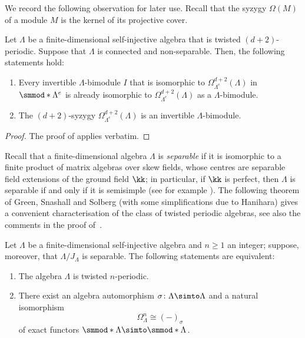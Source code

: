 \documentclass[a4paper]{amsart}
\begin{document}
We record the following observation for later use. Recall that the syzygy
$\Omega(M)$ of a module $M$ is the kernel of its projective cover.

\begin{proposition}
  \label{prop:unique_suspension} Let $\Lambda$ be a finite-dimensional
  self-injective algebra that is twisted $(d+2)$-periodic. Suppose that
  $\Lambda$ is connected and non-separable. Then, the following statements hold:
  \begin{enumerate}
  \item Every invertible $\Lambda$-bimodule $I$ that is isomorphic to
    $\Omega_{\Lambda^e}^{d+2}(\Lambda)$ in $\smmod*{\Lambda^e}$ is already
    isomorphic to $\Omega_{\Lambda^e}^{d+2}(\Lambda)$ as a $\Lambda$-bimodule.
  \item The $(d+2)$-syzygy $\Omega_{\Lambda^e}^{d+2}(\Lambda)$ is an invertible
    $\Lambda$-bimodule.
  \end{enumerate}
\end{proposition}
\begin{proof}
  The proof of \cite[Prop.~9.8]{Mur22} applies verbatim.
\end{proof}

Recall that a finite-dimensional algebra $\Lambda$ is \emph{separable} if it is
isomorphic to a finite product of matrix algebras over skew fields, whose centres are
separable field extensions of the ground field $\kk$; in particular, if $\kk$ is
perfect, then $\Lambda$ is separable if and only if it is semisimple (see for
example \cite[Sec.~9.2.1]{Wei94}). The following theorem of Green, Snashall and
Solberg (with some simplifications due to Hanihara) gives a convenient
characterisation of the class of twisted periodic algebras, see also the
comments in the proof of~\cite[Prop.~3.5]{CDIM20}.

\begin{theorem}
  \label{thm:GSS_twisted_periodicity}
  Let $\Lambda$ be a finite-dimensional self-injective algebra and $n\geq1$ an
  integer; suppose, moreover, that $\Lambda/J_\Lambda$ is separable. The
  following statements are equivalent:
  \begin{enumerate}
  \item The algebra $\Lambda$ is twisted $n$-periodic.
  \item There exist an algebra automorphism $\sigma\colon\Lambda\simto\Lambda$
    and a natural isomorphism
    \[
      \Omega_\Lambda^n\cong(-)_\sigma
    \]
    of exact functors $\smmod*{\Lambda}\simto\smmod*{\Lambda}$.
  \end{enumerate}
\end{theorem}
\end{document}
